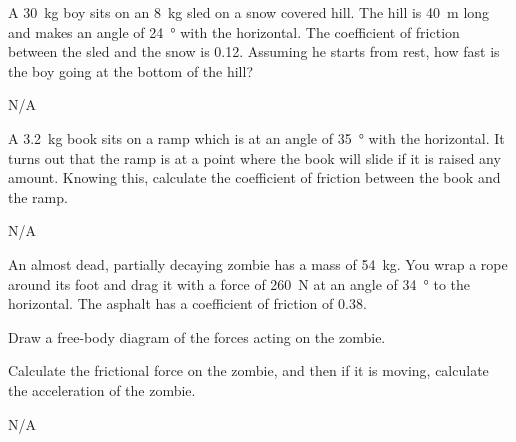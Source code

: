 \begin{question}[ID=friction-B-Q02,topic=friction,difficulty=B]
    A \SI{30}{\kilo\gram} boy sits on an \SI{8}{\kilo\gram} sled
        on a snow covered hill.
    The hill is \SI{40}{\meter} long and makes an angle of
        \SI{24}{\degree} with the horizontal.
    The coefficient of friction between the sled and the snow is
        \num{0.12}.
    Assuming he starts from rest, how fast is the boy going at
        the bottom of the hill?
\end{question}
\begin{solution}
    N/A
\end{solution}


\begin{question}[ID=friction-B-Q03,topic=friction,difficulty=B]
    A \SI{3.2}{\kilo\gram} book sits on a ramp which is at an
        angle of \SI{35}{\degree} with the horizontal.
    It turns out that the ramp is at a point where the book
        will slide if it is raised any amount.
    Knowing this, calculate the coefficient of friction between the
        book and the ramp.
\end{question}
\begin{solution}
    N/A
\end{solution}


\begin{question}[ID=friction-C-Q01,topic=friction,difficulty=C]
    An almost dead, partially decaying zombie has a
        mass of \SI{54}{\kilo\gram}.
    You wrap a rope around its foot and drag it with
        a force of \SI{260}{\newton} at an angle
        of \SI{34}{\degree} to the horizontal.
    The asphalt has a coefficient of friction of \num{0.38}.
    \begin{enumerate*}[label=\arabic*)]
        \item Draw a free-body diagram of the forces acting on the zombie.
        \item Calculate the frictional force on the zombie, and then if it
            is moving, calculate the acceleration of the zombie.
    \end{enumerate*}
\end{question}
\begin{solution}
    N/A
\end{solution}


